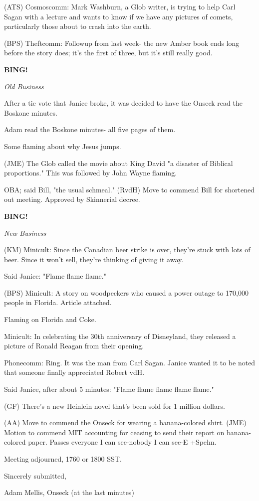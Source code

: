 \documentclass[12pt]{article}
\newcommand{\bing}{{\bf BING!} }
\newcommand{\goto}[1]{\bing \vskip 12pt \centerline{{\em{#1}}}}
\begin{document}
(ATS) Cosmoscomm: Mark Washburn, a Glob writer, is trying to help Carl Sagan with a lecture and wants to know if we have any pictures of comets, particularly those about to crash into the earth.

(BPS) Theftcomm: Followup from last week- the new Amber book ends long before the story does; it's the first of three, but it's still really good.

\goto{Old Business}

After a tie vote that Janice broke, it was decided to have the Onseck read the Boskone minutes.

Adam read the Boskone minutes- all five pages of them.

Some flaming about why Jesus jumps.

(JME) The Glob called the movie about King David "a disaster of Biblical proportions." This was followed by John Wayne flaming.

OBA; said Bill, "the usual schmeal." (RvdH) Move to commend Bill for shortened out meeting. Approved by Skinnerial decree.

\goto{New Business}

(KM) Minicult: Since the Canadian beer strike is over, they're stuck with lots of beer. Since it won't sell, they're thinking of giving it away.

Said Janice: "Flame flame flame."

(BPS) Minicult: A story on woodpeckers who caused a power outage to 170,000 people in Florida. Article attached.

Flaming on Florida and Coke.

Minicult: In celebrating the 30th anniversary of Disneyland, they released a picture of Ronald Reagan from their opening.

Phonecomm: Ring. It was the man from Carl Sagan. Janice wanted it to be noted that someone finally appreciated Robert vdH.

Said Janice, after about 5 minutes: "Flame flame flame flame flame."

(GF) There's a new Heinlein novel that's been sold for 1 million dollars.

(AA) Move to commend the Onseck for wearing a banana-colored shirt. (JME) Motion to commend MIT accounting for ceasing to send their report on banana-colored paper. Passes everyone I can see-nobody I can see-E +Spehn.

\vspace{12pt}

\noindent
Meeting adjourned, 1760 or 1800 SST.

\vspace{18pt}

\centerline{Sincerely submitted,}
\centerline{Adam Mellis, Onseck (at the last minutes)}
\end{document}
